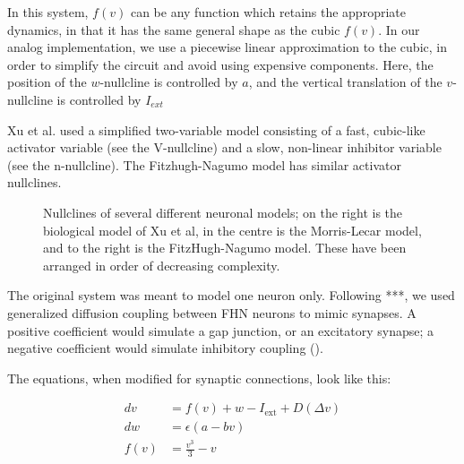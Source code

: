 \documentclass[
    11pt,
]{article}
\begin{document}
In this system, $f(v)$ can be any function which retains the appropriate dynamics, in that it has the same general shape as the cubic $f(v)$.  In our analog implementation, we use a piecewise linear approximation to the cubic, in order to simplify the circuit and avoid using expensive components.  Here, the position of the $w$-nullcline is controlled by $a$, and the vertical translation of the $v$-nullcline is controlled by $I_{ext}$

Xu et al. used a simplified two-variable model consisting of a fast, cubic-like activator variable (see the V-nullcline) and a slow, non-linear inhibitor variable (see the n-nullcline). The Fitzhugh-Nagumo model has similar activator nullclines.

\begin{figure}[h!]
    \label{fig: nm nullclines}
    \centering
    \caption{Nullclines of several different neuronal models; on the right is the biological model of Xu et al, in the centre is the Morris-Lecar model, and to the right is the FitzHugh-Nagumo model.  These have been arranged in order of decreasing complexity.}
\end{figure} %

The original system was meant to model one neuron only.  Following ***, we used 
generalized diffusion coupling between FHN neurons to mimic synapses. 
A positive coefficient would simulate a gap junction, or
an excitatory synapse; a negative coefficient would simulate inhibitory
coupling (\citet{collins1994}).


The equations, when modified for synaptic connections, look like this:

\begin{equation}
    \label{eq: fhnd}
    \begin{aligned}
        dv   &= f(v) + w - I_\mathrm{ext} + D(Δv)\\ %
        dw   &= ϵ(a - bv)\\
        f(v) &= \frac{v^3}{3} - v
    \end{aligned}
\end{equation}
\end{document}
